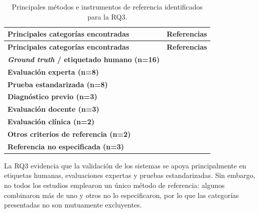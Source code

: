 \documentclass{iaesarticle}
\renewcommand{\arraystretch}{1.3}
\begin{document}
{\small
\renewcommand{\arraystretch}{1.3}
\setlength{\tabcolsep}{3pt}
\begin{longtable}{|
>{\raggedright\arraybackslash}p{}|
>{\raggedright\arraybackslash}p{}|}
\caption{Principales métodos e instrumentos de referencia identificados para la RQ3.}
\label{tab:rq3_referencias}\\
\hline
\rowcolor{blue!10}
\textbf{Principales categorías encontradas} & \textbf{Referencias} \\
\hline
\endfirsthead
\hline
\rowcolor{blue!10}
\textbf{Principales categorías encontradas} & \textbf{Referencias} \\
\hline
\endhead
\hline
\endfoot

\textbf{\textit{Ground truth} / etiquetado humano (n=16)} &
\cite{Villegas-Cubas2026,Villegas-Ch2024,Khalid2024,AlShehri2025,Alshahrani2026,Dui2022,Zaibi2024,Pysal2021,Pardos2022,Bouhamoum2024,Rahim2024,Polsley2022,Shravya2024,Boehme2024,Gouraguine2025,Vanjari2026} \\ \hline

\textbf{Evaluación experta (n=8)} &
\cite{Lee2019,Bublin2023,Inoue2025,Khalid2024,Devillaine2021,Galaz2020,Gavenciak2025,Polsley2022} \\ \hline

\textbf{Prueba estandarizada (n=8)} &
\cite{Lee2019,Bublin2023,Inoue2025,Devillaine2021,Galaz2020,Talkar2020,Gavenciak2025,Huang2025} \\ \hline

\textbf{Diagnóstico previo (n=3)} &
\cite{Shin2022,Talkar2020,Ikermane2023} \\ \hline

\textbf{Evaluación docente (n=3)} &
\cite{Dui2022,Duangmanee2025,Bonneton-Bott2020} \\ \hline

\textbf{Evaluación clínica (n=2)} &
\cite{Talkar2020,Hwang2025} \\ \hline

\textbf{Otros criterios de referencia (n=2)} &
\cite{Boehme2024,Bonneton-Bott2020} \\ \hline

\textbf{Referencia no especificada (n=3)} &
\cite{Brons2021,Serpa-Andrade2021,Vanjari2026} \\

\end{longtable}
}

La RQ3 evidencia que la validación de los sistemas se apoya principalmente en etiquetas humanas, evaluaciones expertas y pruebas estandarizadas. Sin embargo, no todos los estudios emplearon un único método de referencia: algunos combinaron más de uno y otros no lo especificaron, por lo que las categorías presentadas no son mutuamente excluyentes.
\end{document}
